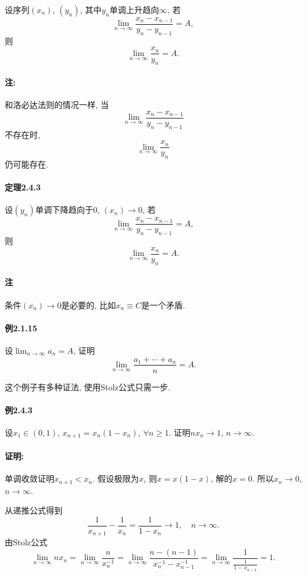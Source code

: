 设序列$(x_{n})$, $(y_{n})$, 其中$y_{n}$单调上升趋向$\infty$, 若
$$
\lim_{n\to\infty}\frac{x_{n}-x_{n-1}}{y_{n}-y_{n-1}}=A,
$$
则
$$
\lim_{n\to\infty}\frac{x_{n}}{y_{n}}=A.
$$


\paragraph{注: }

和洛必达法则的情况一样, 当
$$
\lim_{n\to\infty}\frac{x_{n}-x_{n-1}}{y_{n}-y_{n-1}}
$$
不存在时, 
$$
\lim_{n\to\infty}\frac{x_{n}}{y_{n}}
$$
仍可能存在.

\paragraph{定理2.4.3}

设$\left(y_{n}\right)$单调下降趋向于0, $\left(x_{n}\right)\to0$, 若
$$
\lim_{n\to\infty}\frac{x_{n}-x_{n-1}}{y_{n}-y_{n-1}}=A,
$$
则
$$
\lim_{n\to\infty}\frac{x_{n}}{y_{n}}=A.
$$


\paragraph{注}

条件$\left(x_{n}\right)\to0$是必要的, 比如$x_{n}\equiv C$是一个矛盾.

\paragraph{例2.1.15}

设$\lim_{n\to\infty}a_{n}=A$, 证明
$$
\lim_{n\to\infty}\frac{a_{1}+\cdots+a_{n}}{n}=A.
$$

这个例子有多种证法, 使用Stolz公式只需一步.

\paragraph{例2.4.3}

设$x_{1}\in\left(0,1\right)$, $x_{n+1}=x_{n}(1-x_{n})$, $\forall n\ge1$.
证明$nx_{n}\to1$, $n\to\infty$.

\paragraph{证明:}

单调收敛证明$x_{n+1}<x_{n}$. 假设极限为$x$, 则$x=x(1-x)$, 解的$x=0$. 所以$x_{n}\to0$,
$n\to\infty$.

从递推公式得到
$$
\frac{1}{x_{n+1}}-\frac{1}{x_{n}}=\frac{1}{1-x_{n}}\to1,\quad n\to\infty.
$$
由Stolz公式
$$
\lim_{n\to\infty}nx_{n}=\lim_{n\to\infty}\frac{n}{x_{n}^{-1}}=\lim_{n\to\infty}\frac{n-(n-1)}{x_{n}^{-1}-x_{n-1}^{-1}}=\lim_{n\to\infty}\frac{1}{\frac{1}{1-x_{n-1}}}=1.
$$


